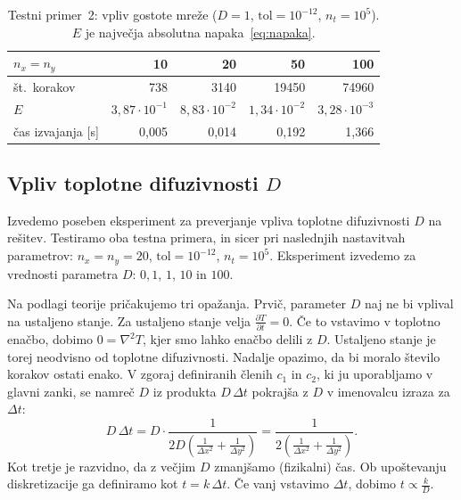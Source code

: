 \documentclass[a4paper,11pt]{article}
\begin{document}
	\begin{table}[htbp]
		\centering
		\begin{tabular}{lrrrr}
			\toprule
			$n_x = n_y$          & 10                       & 20                       & 50                       & 100                      \\
			\midrule
			št.\ korakov         & 738                      & 3140                     & 19450                    & 74960                    \\
			$E$                  & $3{,}87 \cdot 10^{-1}$  & $8{,}83 \cdot 10^{-2}$  & $1{,}34 \cdot 10^{-2}$  & $3{,}28 \cdot 10^{-3}$  \\
			čas izvajanja [s]    & 0{,}005                  & 0{,}014                  & 0{,}192                  & 1{,}366                  \\
			\bottomrule
		\end{tabular}
		\caption{Testni primer~2: vpliv gostote mreže ($D = 1$, $\text{tol} = 10^{-12}$, $n_t = 10^5$). $E$ je največja absolutna napaka~\eqref{eq:napaka}.}
		\label{tab:mreza2}
	\end{table}
	
	\subsection{Vpliv toplotne difuzivnosti $D$}
	
	Izvedemo poseben eksperiment za preverjanje vpliva toplotne difuzivnosti $D$ na rešitev. Testiramo oba testna primera, in sicer pri naslednjih nastavitvah parametrov: $n_x = n_y = 20$, $\text{tol} = 10^{-12}$, $n_t = 10^5$. Eksperiment izvedemo za vrednosti parametra $D$: $0{,}1$, $1$, $10$ in $100$.
	
	Na podlagi teorije pričakujemo tri opažanja. Prvič, parameter $D$ naj ne bi vplival na ustaljeno stanje. Za ustaljeno stanje velja $\frac{\partial T}{\partial t} = 0$. Če to vstavimo v toplotno enačbo, dobimo $0 = \nabla^2 T$, kjer smo lahko enačbo delili z $D$. Ustaljeno stanje je torej neodvisno od toplotne difuzivnosti. Nadalje opazimo, da bi moralo število korakov ostati enako. V zgoraj definiranih členih $c_1$ in $c_2$, ki ju uporabljamo v glavni zanki, se namreč $D$ iz produkta $D\,\Delta t$ pokrajša z $D$ v imenovalcu izraza za $\Delta t$:
	\begin{equation}
		D\,\Delta t = D \cdot \frac{1}{2D\left(\frac{1}{\Delta x^2} + \frac{1}{\Delta y^2}\right)} = \frac{1}{2\left(\frac{1}{\Delta x^2} + \frac{1}{\Delta y^2}\right)}.
	\end{equation}
	Kot tretje je razvidno, da z večjim $D$ zmanjšamo (fizikalni) čas. Ob upoštevanju diskretizacije ga definiramo kot $t = k\,\Delta t$. Če vanj vstavimo $\Delta t$, dobimo $t \propto \frac{k}{D}$.
	
\end{document}
